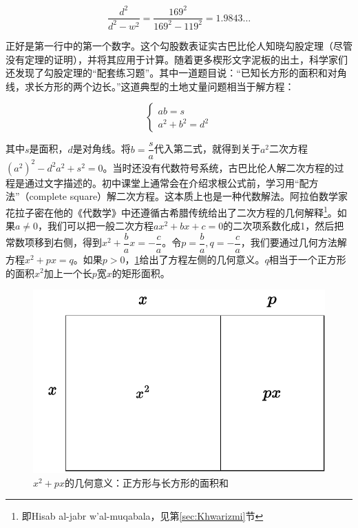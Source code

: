 \documentclass[b5paper]{ctexart}
\begin{document}
\[
\frac{d^2}{d^2 - w^2} = \frac{169^2}{169^2 - 119^2} = 1.9843\dotso
\]

正好是第一行中的第一个数字。这个勾股数表证实古巴比伦人知晓勾股定理（尽管没有定理的证明），并将其应用于计算。随着更多楔形文字泥板的出土，科学家们还发现了勾股定理的“配套练习题”。其中一道题目说：“已知长方形的面积和对角线，求长方形的两个边长。”这道典型的土地丈量问题相当于解方程：

\[
\begin{cases}
  ab = s \\
  a^2 + b^2 = d^2
\end{cases}
\]

其中$s$是面积，$d$是对角线。将$b = \dfrac{s}{a}$代入第二式，就得到关于$a^2$二次方程$(a^2)^2 - d^2 a^2 + s^2 = 0$。当时还没有代数符号系统，古巴比伦人解二次方程的过程是通过文字描述的。初中课堂上通常会在介绍求根公式前，学习用“配方法”（complete square）解二次方程。这本质上也是一种代数解法。阿拉伯数学家花拉子密在他的《代数学》中还遵循古希腊传统给出了二次方程的几何解释\footnote{即Hisab al-jabr w'al-muqabala，见第\ref{sec:Khwarizmi}节}。如果$a \ne 0$，我们可以把一般二次方程$ax^2 + bx + c = 0$的二次项系数化成1，然后把常数项移到右侧，得到$x^2 + \dfrac{b}{a}x = -\dfrac{c}{a}$。令$p = \dfrac{b}{a}, q= -\dfrac{c}{a}$，我们要通过几何方法解方程$x^2 + px = q$。如果$p > 0$，\cref{fig:quadratic1}给出了方程左侧的几何意义。$q$相当于一个正方形的面积$x^2$加上一个长$p$宽$x$的矩形面积。

\begin{figure}[htbp]
  \centering
  \includegraphics[scale=0.5]{img/quadratic1}
  \caption{$x^2 + px$的几何意义：正方形与长方形的面积和}
 \label{fig:quadratic1}
\end{figure}
\end{document}
